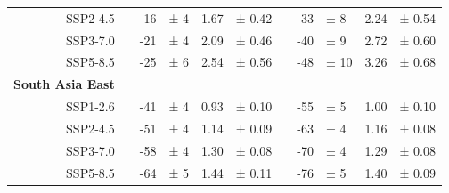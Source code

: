 \begin{table}[htp]
\begin{tabular}{@{}rlrlrllrlrl@{}}
          SSP2-4.5 & \phantom{a} & -16 & ± 4 & 1.67 & ± 0.42 & \phantom{a} & -33 & ± 8 & 2.24 & ± 0.54\\
          SSP3-7.0 & \phantom{a} & -21 & ± 4 & 2.09 & ± 0.46 & \phantom{a} & -40 & ± 9 & 2.72 & ± 0.60\\
          SSP5-8.5 & \phantom{a} & -25 & ± 6 & 2.54 & ± 0.56 & \phantom{a} & -48 & ± 10 & 3.26 & ± 0.68\\
          \textbf{South Asia East}\\
          SSP1-2.6 & \phantom{a} & -41 & ± 4 & 0.93 & ± 0.10 & \phantom{a} & -55 & ± 5 & 1.00 & ± 0.10\\
          SSP2-4.5 & \phantom{a} & -51 & ± 4 & 1.14 & ± 0.09 & \phantom{a} & -63 & ± 4 & 1.16 & ± 0.08\\
          SSP3-7.0 & \phantom{a} & -58 & ± 4 & 1.30 & ± 0.08 & \phantom{a} & -70 & ± 4 & 1.29 & ± 0.08\\
          SSP5-8.5 & \phantom{a} & -64 & ± 5 & 1.44 & ± 0.11 & \phantom{a} & -76 & ± 5 & 1.40 & ± 0.09\\
          \bottomrule
        \end{tabular}
        

\end{table}
